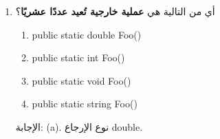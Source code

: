 \documentclass[14pt]{extarticle}
\begin{document}
\begin{enumerate}[itemsep=1.8em]

\item
أي من التالية هي \textbf{عملية خارجية تُعيد عددًا عشريًا}؟
\begin{english}
\begin{enumerate}[label=(\alph*)]
    \item public static double Foo()
    \item public static int Foo()
    \item public static void Foo()
    \item public static string Foo()
\end{enumerate}
\end{english}
\ifwithsols
\begin{boxSolution}
الإجابة: (a).
نوع الإرجاع double.
\end{boxSolution}
\fi

\end{enumerate}
\end{document}
